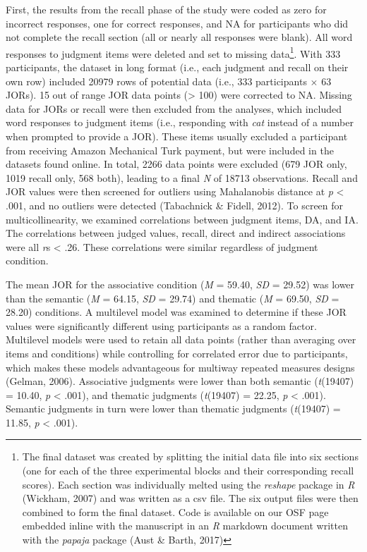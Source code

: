 \documentclass[english,,man]{apa6}
\let\rmarkdownfootnote\footnote%
\def\footnote{\protect\rmarkdownfootnote}
\begin{document}
First, the results from the recall phase of the study were coded as zero for incorrect responses, one for correct responses, and NA for participants who did not complete the recall section (all or nearly all responses were blank). All word responses to judgment items were deleted and set to missing data\footnote{The final dataset was created by splitting the initial data file into six sections (one for each of the three experimental blocks and their corresponding recall scores). Each section was individually melted using the \emph{reshape} package in \emph{R} (Wickham, 2007) and was written as a csv file. The six output files were then combined to form the final dataset. Code is available on our OSF page embedded inline with the manuscript in an \emph{R} markdown document written with the \emph{papaja} package (Aust \& Barth, 2017)}. With 333 participants, the dataset in long format (i.e., each judgment and recall on their own row) included 20979 rows of potential data (i.e., 333 participants \(\times\) 63 JORs). 15 out of range JOR data points (\textgreater{} 100) were corrected to NA. Missing data for JORs or recall were then excluded from the analyses, which included word responses to judgment items (i.e., responding with \emph{cat} instead of a number when prompted to provide a JOR). These items usually excluded a participant from receiving Amazon Mechanical Turk payment, but were included in the datasets found online. In total, 2266 data points were excluded (679 JOR only, 1019 recall only, 568 both), leading to a final \emph{N} of 18713 observations. Recall and JOR values were then screened for outliers using Mahalanobis distance at \emph{p} \textless{} .001, and no outliers were detected (Tabachnick \& Fidell, 2012). To screen for multicollinearity, we examined correlations between judgment items, DA, and IA. The correlations between judged values, recall, direct and indirect associations were all \emph{r}s \textless{} .26. These correlations were similar regardless of judgment condition.

The mean JOR for the associative condition (\emph{M} = 59.40, \emph{SD} = 29.52) was lower than the semantic (\emph{M} = 64.15, \emph{SD} = 29.74) and thematic (\emph{M} = 69.50, \emph{SD} = 28.20) conditions. A multilevel model was examined to determine if these JOR values were significantly different using participants as a random factor. Multilevel models were used to retain all data points (rather than averaging over items and conditions) while controlling for correlated error due to participants, which makes these models advantageous for multiway repeated measures designs (Gelman, 2006). Associative judgments were lower than both semantic (\emph{t}(19407) = 10.40, \emph{p} \textless{} .001), and thematic judgments (\emph{t}(19407) = 22.25, \emph{p} \textless{} .001). Semantic judgments in turn were lower than thematic judgments (\emph{t}(19407) = 11.85, \emph{p} \textless{} .001).
\end{document}
